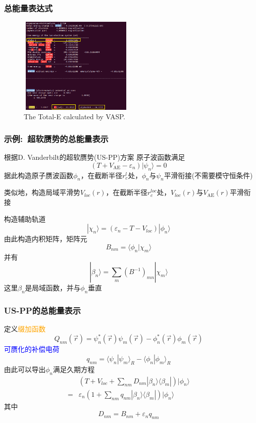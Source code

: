 \frame
{
	\frametitle{总能量表达式}
\fontsize{6.5pt}{4.2pt}
\begin{figure}[h!]
\centering
\vspace*{-0.18in}
\includegraphics[height=1.85in,width=2.2in,viewport=0 0 600 495,clip]{Figures/VASP_Total_ENE.png}
\caption{\tiny \textrm{The Total-E calculated by VASP.}}%
\label{TOTEN_VASP}
\end{figure}
}

\frame
{
	\frametitle{示例:~超软赝势的总能量表示}
	根据\textrm{D. Vanderbilt}的超软赝势(\textrm{US-PP})方案
	原子波函数满足$$(T+V_{\mathrm{AE}}-\varepsilon_n)|\psi_n\rangle=0$$
	据此构造原子赝波函数$\phi_n$，在截断半径$r_c^l$处，$\phi_n$与$\psi_n$平滑衔接(不需要模守恒条件)

	类似地，构造局域平滑势$V_{loc}(r)$，在截断半径$r_c^{loc}$处，$V_{loc}(r)$与$V_{\mathrm{AE}}(r)$平滑衔接
	
	构造辅助轨道
	$$|\chi_n\rangle=(\varepsilon_n-T-V_{loc})|\phi_n\rangle$$
	由此构造内积矩阵，矩阵元$$B_{nm}=\langle\phi_n|\chi_m\rangle$$
	并有$$|\beta_n\rangle=\sum_m(B^{-1})_{mn}|\chi_m\rangle$$
	这里$\beta_n$是局域函数，并与$\phi_n$垂直
}

\frame
{
	\frametitle{\textrm{US-PP}的总能量表示}
	定义\textcolor{orange}{缀加函数}$$Q_{nm}(\vec r)=\psi_n^{\ast}(\vec r)\psi_m(\vec r)-\phi_n^{\ast}(\vec r)\phi_m(\vec r)$$
	\textcolor{blue}{可赝化的补偿电荷}$$q_{nm}=\langle\psi_n|\psi_m\rangle_R-\langle\phi_n|\phi_m\rangle_R$$
	由此可以导出$\phi_n$满足久期方程
	\begin{displaymath}
		\begin{aligned}
			&\left(T+V_{loc}+\sum_{nm}D_{nm}|\beta_n\rangle\langle\beta_m|\right)|\phi_n\rangle\\
			=&\varepsilon_n\left(1+\sum_{nm}q_{nm}|\beta_n\rangle\langle\beta_m|\right)|\phi_n\rangle
		\end{aligned}
	\end{displaymath}
	其中$$D_{nm}=B_{nm}+\varepsilon_nq_{nm}$$
}

